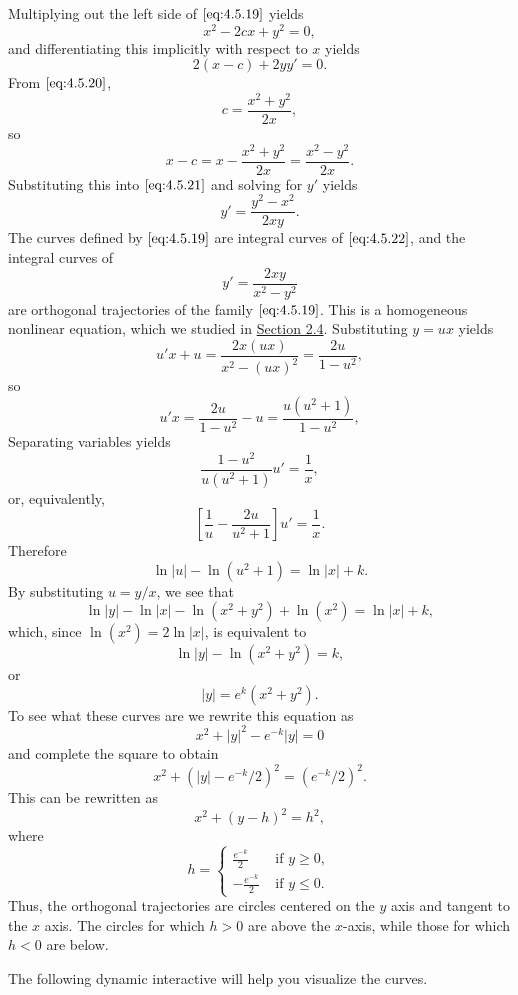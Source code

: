 \documentclass{ximera}
\begin{document}
\begin{example}
\begin{explanation}
Multiplying out the left side of $\eqref{eq:4.5.19}$ yields
\begin{equation} \label{eq:4.5.20}
x^2-2cx+y^2=0,
\end{equation}
and differentiating this implicitly with respect to $x$ yields
\begin{equation} \label{eq:4.5.21}
2(x-c)+2yy'=0.
\end{equation}
 From $\eqref{eq:4.5.20}$,
$$
c=\frac{x^2+y^2}{2x},
$$
so
$$
x-c=x-\frac{x^2+y^2}{2x}=\frac{x^2-y^2}{2x}.
$$
Substituting this into $\eqref{eq:4.5.21}$ and solving for $y'$ yields
\begin{equation} \label{eq:4.5.22}
y'=\frac{y^2-x^2}{2xy}.
\end{equation}
The curves defined by $\eqref{eq:4.5.19}$ are integral curves of
$\eqref{eq:4.5.22}$, and the integral curves of
$$
y'=\frac{2xy}{x^2-y^2}
$$
are orthogonal trajectories of the family $\eqref{eq:4.5.19}$. This is a
homogeneous nonlinear equation, which we studied in
\href{https://xerxes.ximera.org/differentialequations/main/nonlinearToSeparable/nonlinearToSeparable}{Section 2.4}. Substituting $y=ux$ yields
$$
u'x+u=\frac{2x(ux)}{x^2-(ux)^2}=\frac{2u}{1-u^2},
$$
so
$$
u'x=\frac{2u}{1-u^2}-u=\frac{u(u^2+1)}{1-u^2},
$$
Separating variables yields
$$
\frac{1-u^2}{u(u^2+1)}u'=\frac{1}{x},
$$
or, equivalently,
$$
\left[\frac{1}{u}-\frac{2u}{u^2+1}\right]u'=\frac{1}{x}.
$$
Therefore
$$
\ln |u|-\ln (u^2+1)=\ln |x|+k.
$$
By substituting $u=y/x$, we see that
$$
\ln|y|-\ln|x|-\ln(x^2+y^2)+\ln(x^2)=\ln|x|+k,
$$
which, since $\ln(x^2)=2\ln|x|$, is equivalent to
$$
\ln|y|-\ln(x^2+y^2)=k,
$$
or
$$
|y|=e^k(x^2+y^2).
$$
To see what these curves are we rewrite this equation as
$$
x^2+|y|^2-e^{-k}|y|=0
$$
and complete the square to obtain
$$
x^2+(|y|-e^{-k}/2)^2=(e^{-k}/2)^2.
$$
This can be rewritten as
$$
x^2+(y-h)^2=h^2,
$$
where
$$
h=\left\{\begin{array}{rl} \frac{e^{-k}}{2}&\mbox{ if } y\geq
0,\\-\frac{e^{-k}}{2}&\mbox{ if } y\leq 0. \end{array}\right.
$$
Thus, the orthogonal trajectories are circles centered on the $y$ axis
and tangent to the $x$ axis. The circles
for which $h>0$ are above the $x$-axis, while those for which $h<0$
are below.


 

The following dynamic interactive will help you visualize the curves.

\begin{center}  
\end{center}

 
\end{explanation}
\end{example}
 
\end{document}
